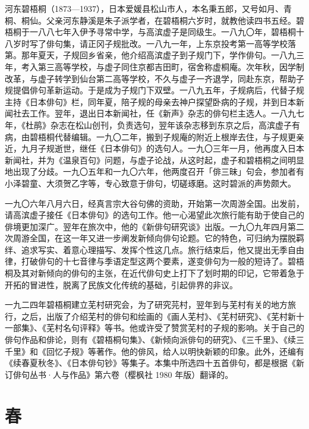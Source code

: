 {\FS
    河东碧梧桐（1873—1937），日本爱媛县松山市人，本名秉五郎，又号如月、青桐、桐仙。父亲河东静溪是朱子派学者，在碧梧桐六岁时，就教他读四书五经。碧梧桐于一八八七年入伊予寻常中学，与高滨虚子是同级生。一八九〇年，碧梧桐十八岁时写了俳句集，请正冈子规批改。一八九一年，上东京投考第一高等学校落第。那年夏天，子规回乡省亲，他介绍高滨虚子到子规门下，学作俳句。一八九三年，考入第三高等学校，与虚子同住京都吉田町，宿舍称虚桐庵。次年秋，因学制改革，与虚子转学到仙台第二高等学校，不久与虚子一齐退学，同赴东京，帮助子规提倡俳句革新运动。于是成为子规门下双壁。一八九五年，子规病后，代替子规主持《日本俳句》栏，同年夏，陪子规的母亲去神户探望卧病的子规，并到日本新闻社去工作。翌年，退出日本新闻社，任《新声》杂志的俳句栏主选人。一八九七年，《杜鹃》杂志在松山创刊，负责选句，翌年该杂志移到东京之后，高滨虚子有病，由碧梧桐代替编辑。一九〇二年，搬到子规庵的附近上根岸去住，与子规更亲近，九月子规逝世，继任《日本俳句》的选句人。一九〇三年一月，他再度入日本新闻社，并为《温泉百句》问题，与虚子论战，从这时起，虚子和碧梧桐之间明显地出现了分歧。一九〇五年和一九〇六年，他两度召开「俳三昧」句会，参加者有小泽碧童、大须贺乙字等，专心致意于俳句，切磋琢磨。这时碧派的声势颇大。

    一九〇六年八月六日，经真言宗大谷句佛的资助，开始第一次周游全国。出发前，请高滨虚子接任《日本俳句》的选句工作。他一心渴望此次旅行能有助于使自己的俳境更加深广。翌年在旅次中，他的《新俳句研究谈》出版。一九〇九年四月第二次周游全国，在这一年又进一步阐发新倾向俳句论题。它的特色，可归纳为摆脱羁绊、追求写实、着意心理描写、发挥个性这几点。旅行结束后，他又提出无季自由律，打破俳句的十七音律与季语定型这两个要素，遂变俳句为一般的短诗了。碧梧桐及其对新倾向的俳句的主张，在近代俳句史上打下了划时期的印记，它带着急于开拓的冒进性，脱离了民族文化传统的基础，引起俳界的非议。

    一九二四年碧梧桐建立芜村研究会，为了研究芫村，翌年到与芜村有关的地方旅行，之后，出版了介绍芜村的俳句和绘画的《画人芜村》、《芜村研究》、《芜村新十一部集》、《芜村名句评释》等书。他或许受了赞赏芜村的子规的影响。关于自己的俳句作品和俳论，则有《碧梧桐句集》、《新倾向派俳句的研究》、《三千里》、《续三千里》和《回忆子规》等著作。他的俳风，给人以明快新颖的印象。此外，还编有《续春夏秋冬》、《日本俳句钞》等集子。本集中所选四十五首俳句，都是根据《新订俳句丛书·人与作品》第六卷（樱枫社 1980 年版）翻译的。
}

\newpage

\section{\FK 春}

